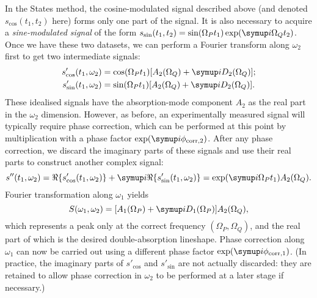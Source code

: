 In the States method, the cosine-modulated signal described above (and denoted $s_\text{cos}(t_1, t_2)$ here) forms only one part of the signal.
It is also necessary to acquire a \textit{sine-modulated signal} of the form $s_\text{sin}(t_1, t_2) = \sin(\Omega_P t_1)\exp(\mi\Omega_Q t_2)$.
Once we have these two datasets, we can perform a Fourier transform along $\omega_2$ first to get two intermediate signals:
\begin{align}
    \label{eq:states_1}
    s'_\text{cos}(t_1, \omega_2) &= \cos(\Omega_P t_1) [A_2(\Omega_Q) + \mi D_2(\Omega_Q)]; \\
    s'_\text{sin}(t_1, \omega_2) &= \sin(\Omega_P t_1) [A_2(\Omega_Q) + \mi D_2(\Omega_Q)].
\end{align}
These idealised signals have the absorption-mode component $A_2$ as the real part in the $\omega_2$ dimension.
However, as before, an experimentally measured signal will typically require phase correction, which can be performed at this point by multiplication with a phase factor $\exp(\mi\phi_{\text{corr},2})$.
After any phase correction, we discard the imaginary parts of these signals and use their real parts to construct another complex signal:
\begin{equation}
    \label{eq:states_3}
    s''(t_1, \omega_2) = \Re\{s'_\text{cos}(t_1, \omega_2)\} + \mi \Re\{s'_\text{sin}(t_1, \omega_2)\} = \exp(\mi \Omega_P t_1)A_2(\Omega_Q).
\end{equation}
Fourier transformation along $\omega_1$ yields
\begin{equation}
    \label{eq:states_4}
    S(\omega_1, \omega_2) = [A_1(\Omega_P) + \mi D_1(\Omega_P)] A_2(\Omega_Q),
\end{equation}
which represents a peak only at the correct frequency $(\Omega_P, \Omega_Q)$, and the real part of which is the desired double-absorption lineshape.
Phase correction along $\omega_1$ can now be carried out using a different phase factor $\exp(\mi\phi_{\text{corr},1})$.
(In practice, the imaginary parts of $s'_\text{cos}$ and $s'_\text{sin}$ are not actually discarded: they are retained to allow phase correction in $\omega_2$ to be performed at a later stage if necessary.)%
